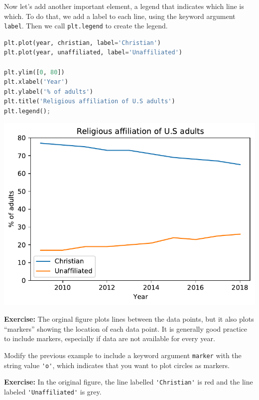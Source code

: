 Now let's add another important element, a legend that indicates which
line is which. To do that, we add a label to each line, using the
keyword argument \passthrough{\lstinline!label!}. Then we call
\passthrough{\lstinline!plt.legend!} to create the legend.

\begin{lstlisting}[language=Python]
plt.plot(year, christian, label='Christian')
plt.plot(year, unaffiliated, label='Unaffiliated')

plt.ylim([0, 80])
plt.xlabel('Year')
plt.ylabel('% of adults')
plt.title('Religious affiliation of U.S adults')
plt.legend();
\end{lstlisting}

\begin{center}
\includegraphics[scale=0.75]{chapters/06_plotting_files/06_plotting_34_0.pdf}
\end{center}

\textbf{Exercise:} The orginal figure plots lines between the data
points, but it also plots ``markers'' showing the location of each data
point. It is generally good practice to include markers, especially if
data are not available for every year.

Modify the previous example to include a keyword argument
\passthrough{\lstinline!marker!} with the string value
\passthrough{\lstinline!'o'!}, which indicates that you want to plot
circles as markers.

\textbf{Exercise:} In the original figure, the line labelled
\passthrough{\lstinline!'Christian'!} is red and the line labeled
\passthrough{\lstinline!'Unaffiliated'!} is grey.


